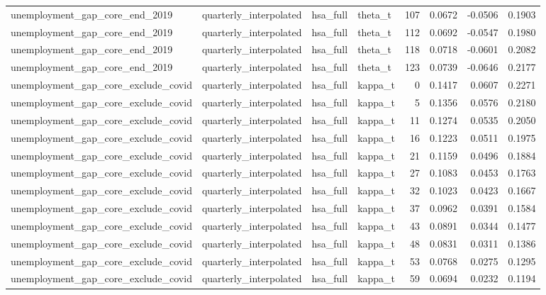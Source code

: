 \begin{tabular}{llllrrrr}
unemployment\_gap\_core\_end\_2019 & quarterly\_interpolated & hsa\_full & theta\_t & 107 & 0.0672 & -0.0506 & 0.1903 \\
unemployment\_gap\_core\_end\_2019 & quarterly\_interpolated & hsa\_full & theta\_t & 112 & 0.0692 & -0.0547 & 0.1980 \\
unemployment\_gap\_core\_end\_2019 & quarterly\_interpolated & hsa\_full & theta\_t & 118 & 0.0718 & -0.0601 & 0.2082 \\
unemployment\_gap\_core\_end\_2019 & quarterly\_interpolated & hsa\_full & theta\_t & 123 & 0.0739 & -0.0646 & 0.2177 \\
unemployment\_gap\_core\_exclude\_covid & quarterly\_interpolated & hsa\_full & kappa\_t & 0 & 0.1417 & 0.0607 & 0.2271 \\
unemployment\_gap\_core\_exclude\_covid & quarterly\_interpolated & hsa\_full & kappa\_t & 5 & 0.1356 & 0.0576 & 0.2180 \\
unemployment\_gap\_core\_exclude\_covid & quarterly\_interpolated & hsa\_full & kappa\_t & 11 & 0.1274 & 0.0535 & 0.2050 \\
unemployment\_gap\_core\_exclude\_covid & quarterly\_interpolated & hsa\_full & kappa\_t & 16 & 0.1223 & 0.0511 & 0.1975 \\
unemployment\_gap\_core\_exclude\_covid & quarterly\_interpolated & hsa\_full & kappa\_t & 21 & 0.1159 & 0.0496 & 0.1884 \\
unemployment\_gap\_core\_exclude\_covid & quarterly\_interpolated & hsa\_full & kappa\_t & 27 & 0.1083 & 0.0453 & 0.1763 \\
unemployment\_gap\_core\_exclude\_covid & quarterly\_interpolated & hsa\_full & kappa\_t & 32 & 0.1023 & 0.0423 & 0.1667 \\
unemployment\_gap\_core\_exclude\_covid & quarterly\_interpolated & hsa\_full & kappa\_t & 37 & 0.0962 & 0.0391 & 0.1584 \\
unemployment\_gap\_core\_exclude\_covid & quarterly\_interpolated & hsa\_full & kappa\_t & 43 & 0.0891 & 0.0344 & 0.1477 \\
unemployment\_gap\_core\_exclude\_covid & quarterly\_interpolated & hsa\_full & kappa\_t & 48 & 0.0831 & 0.0311 & 0.1386 \\
unemployment\_gap\_core\_exclude\_covid & quarterly\_interpolated & hsa\_full & kappa\_t & 53 & 0.0768 & 0.0275 & 0.1295 \\
unemployment\_gap\_core\_exclude\_covid & quarterly\_interpolated & hsa\_full & kappa\_t & 59 & 0.0694 & 0.0232 & 0.1194 \\

\end{tabular}
